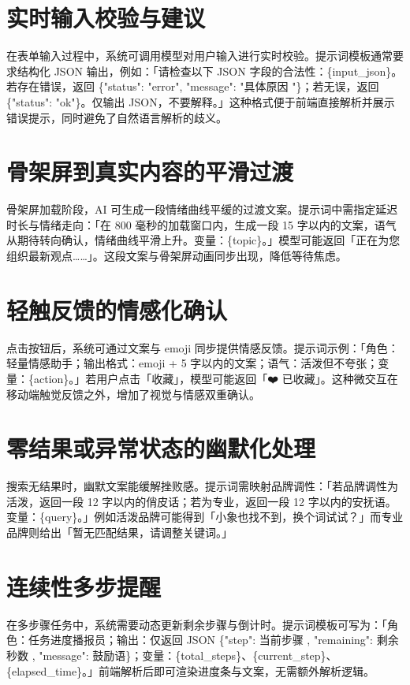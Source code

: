 \section{实时输入校验与建议}
在表单输入过程中，系统可调用模型对用户输入进行实时校验。提示词模板通常要求结构化 JSON 输出，例如：「请检查以下 JSON 字段的合法性：\{{}input\_{}json\}{}。若存在错误，返回 \{{}"status": "error", "message": "具体原因 "\}{}；若无误，返回 \{{}"status": "ok"\}{}。仅输出 JSON，不要解释。」这种格式便于前端直接解析并展示错误提示，同时避免了自然语言解析的歧义。\par
\section{骨架屏到真实内容的平滑过渡}
骨架屏加载阶段，AI 可生成一段情绪曲线平缓的过渡文案。提示词中需指定延迟时长与情绪走向：「在 800 毫秒的加载窗口内，生成一段 15 字以内的文案，语气从期待转向确认，情绪曲线平滑上升。变量：\{{}topic\}{}。」模型可能返回「正在为您组织最新观点……」。这段文案与骨架屏动画同步出现，降低等待焦虑。\par
\section{轻触反馈的情感化确认}
点击按钮后，系统可通过文案与 emoji 同步提供情感反馈。提示词示例：「角色：轻量情感助手；输出格式：emoji + 5 字以内的文案；语气：活泼但不夸张；变量：\{{}action\}{}。」若用户点击「收藏」，模型可能返回「❤️ 已收藏」。这种微交互在移动端触觉反馈之外，增加了视觉与情感双重确认。\par
\section{零结果或异常状态的幽默化处理}
搜索无结果时，幽默文案能缓解挫败感。提示词需映射品牌调性：「若品牌调性为活泼，返回一段 12 字以内的俏皮话；若为专业，返回一段 12 字以内的安抚语。变量：\{{}query\}{}。」例如活泼品牌可能得到「小象也找不到，换个词试试？」而专业品牌则给出「暂无匹配结果，请调整关键词。」\par
\section{连续性多步提醒}
在多步骤任务中，系统需要动态更新剩余步骤与倒计时。提示词模板可写为：「角色：任务进度播报员；输出：仅返回 JSON \{{}"step": 当前步骤 , "remaining": 剩余秒数 , "message": 鼓励语\}{}；变量：\{{}total\_{}steps\}{}、\{{}current\_{}step\}{}、\{{}elapsed\_{}time\}{}。」前端解析后即可渲染进度条与文案，无需额外解析逻辑。\par
